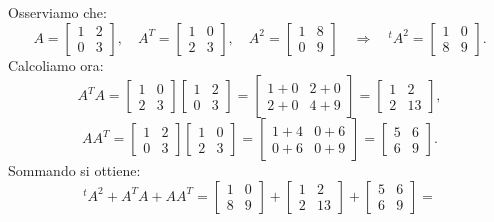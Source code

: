 \documentclass{article}
\theoremstyle{plain}
\theoremstyle{definition}
\theoremstyle{remark}
\begin{document}
\begin{enumerate}
    Osserviamo che:
    \[
    A=\begin{bmatrix}1&2\\0&3\end{bmatrix},\quad
    A^T=\begin{bmatrix}1&0\\2&3\end{bmatrix},\quad
    A^2=\begin{bmatrix}1&8\\0&9\end{bmatrix}\quad\Longrightarrow\quad
    {}^{t}A^2=\begin{bmatrix}1&0\\8&9\end{bmatrix}.
    \]
    Calcoliamo ora:
    \[
    A^T A=\begin{bmatrix}1&0\\2&3\end{bmatrix}\begin{bmatrix}1&2\\0&3\end{bmatrix}
    =\begin{bmatrix}1+0 & 2+0\\2+0 & 4+9\end{bmatrix}=
    \begin{bmatrix}1&2\\2&13\end{bmatrix},
    \]
    \[
    AA^T=\begin{bmatrix}1&2\\0&3\end{bmatrix}\begin{bmatrix}1&0\\2&3\end{bmatrix}
    =\begin{bmatrix}1+4&0+6\\0+6&0+9\end{bmatrix}=
    \begin{bmatrix}5&6\\6&9\end{bmatrix}.
    \]
    Sommando si ottiene:
    \[
    {}^{t}A^2+A^TA+AA^T=
    \begin{bmatrix}1&0\\8&9\end{bmatrix}+
    \begin{bmatrix}1&2\\2&13\end{bmatrix}+
    \begin{bmatrix}5&6\\6&9\end{bmatrix}=
\]
\end{enumerate}
\end{document}
